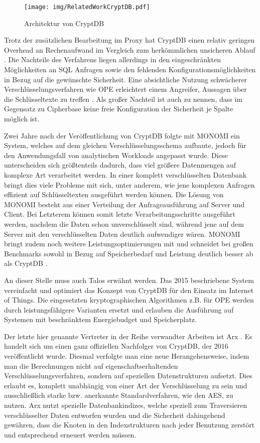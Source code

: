 \begin{figure}
	\texttt{[image: img/RelatedWorkCryptDB.pdf]}
	\centering
	\caption{Architektur von CryptDB}
	\label{fig:cryptdb}
\end{figure}

Trotz der zusätzlichen Bearbeitung im Proxy hat CryptDB einen relativ geringen Overhead an Rechenaufwand im Vergleich zum herkömmlichen unsicheren Ablauf \cite{Popa2012}. Die Nachteile des Verfahrens liegen allerdings in den eingeschränkten Möglichkeiten an \ac{SQL} Anfragen sowie den fehlenden Konfigurationsmöglichkeiten in Bezug auf die gewünschte Sicherheit. Eine absichtliche Nutzung schwächerer Verschlüsselungsverfahren wie \ac{OPE} erleichtert einem Angreifer, Aussagen über die Schlüsseltexte zu treffen \cite{Poddar2016}. Als großer Nachteil ist auch zu nennen, dass im Gegensatz zu Cipherbase keine freie Konfiguration der Sicherheit je Spalte möglich ist.

Zwei Jahre nach der Veröffentlichung von CryptDB folgte mit MONOMI \cite{Tu2013} ein System, welches auf dem gleichen Verschlüsselungsschema aufbaute, jedoch für den Anwendungsfall von analytischen Workloads angepasst wurde. Diese unterscheiden sich größtenteils dadurch, dass viel größere Datenmengen auf komplexe Art verarbeitet werden. In einer komplett verschlüsselten Datenbank bringt dies viele Probleme mit sich, unter anderem, wie jene komplexen Anfragen effizient auf Schlüsseltexten ausgeführt werden können. Die Lösung von MONOMI besteht aus einer Verteilung der Anfrageausführung auf Server und Client. Bei Letzterem können somit letzte Verarbeitungsschritte ausgeführt werden, nachdem die Daten schon unverschlüsselt sind, während jene auf dem Server mit den verschlüsselten Daten deutlich aufwendiger wären. MONOMI bringt zudem noch weitere Leistungsoptimierungen mit und schneidet bei großen Benchmarks sowohl in Bezug auf Speicherbedarf und Leistung deutlich besser ab als CryptDB \cite{Tu2013}.

An dieser Stelle muss auch Talos \cite{Shafagh2015} erwähnt werden. Das 2015 beschriebene System vereinfacht und optimiert das Konzept von CryptDB für den Einsatz im Internet of Things. Die eingesetzten kryptographischen Algorithmen z.B. für \ac{OPE} werden durch leistungsfähigere Varianten ersetzt und erlauben die Ausführung auf Systemen mit beschränktem Energiebudget und Speicherplatz.

Der letzte hier genannte Vertreter in der Reihe verwandter Arbeiten ist Arx \cite{Poddar2016}. Es handelt sich um einen ganz offiziellen Nachfolger von CryptDB, der 2016 veröffentlicht wurde. Diesmal verfolgte man eine neue Herangehensweise, indem man die Berechnungen nicht auf eigenschaftserhaltenden Verschlüsselungsverfahren, sondern auf speziellen Datenstrukturen aufsetzt. Dies erlaubt es, komplett unabhängig von einer Art der Verschlüsselung zu sein und ausschließlich starke bzw. anerkannte Standardverfahren, wie den \ac{AES}, zu nutzen. Arx nutzt spezielle Datenbankindizes, welche speziell zum Traversieren verschlüsselter Daten entworfen wurden und die Sicherheit dahingehend gewähren, dass die Knoten in den Indexstrukturen nach jeder Benutzung zerstört und entsprechend erneuert werden müssen.


